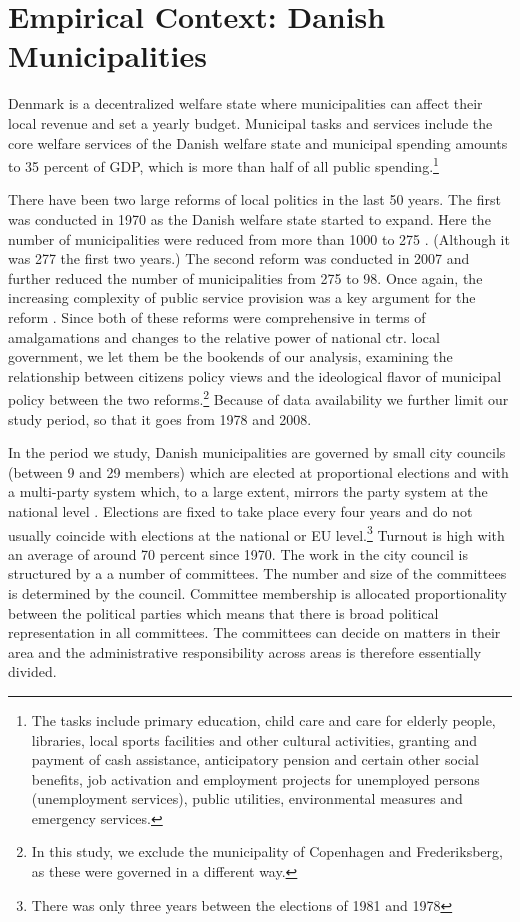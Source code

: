 \documentclass[a4paper,12pt]{article}
\begin{document}
\section{Empirical Context: Danish Municipalities}	
Denmark is a decentralized welfare state where municipalities can affect their local revenue and set a yearly budget.  Municipal tasks and services include the core welfare services of the Danish welfare state and municipal spending amounts to 35 percent of GDP, which is more than half of all public spending.\footnote{The tasks include primary education, child care and care for elderly people, libraries, local sports facilities and other cultural activities, granting and payment of cash assistance, anticipatory pension and certain other social benefits, job activation and employment projects for unemployed persons (unemployment services), public utilities, environmental measures and emergency services.}

There have been two large reforms of local politics in the last 50 years. The first was conducted in 1970 as the Danish welfare state started to expand. Here the number of municipalities were reduced from more than 1000 to 275 \citep{ingvartsen1991kommunalreformen}. (Although it was 277 the first two years.)  The second reform was conducted in 2007 and further reduced the number of municipalities from 275 to 98. Once again, the increasing complexity of public service provision was a key argument for the reform \citep{christiansen2008utaenkelige}. Since both of these reforms were comprehensive in terms of amalgamations and changes to the relative power of national ctr. local government, we let them be the bookends of our analysis, examining the relationship between citizens policy views and the ideological flavor of municipal policy between the two reforms.\footnote{In this study, we exclude the municipality of Copenhagen and Frederiksberg, as these were governed in a different way.} Because of data availability we further limit our study period, so that it goes from 1978 and 2008.


In the period we study, Danish municipalities are governed by small city councils (between 9 and 29 members) which are elected at proportional elections and with a multi-party system which, to a large extent, mirrors the party system at the national level \citep{blom2013et}. Elections are fixed to take place every four years and do not usually coincide with elections at the national or EU level.\footnote{There was only three years between the elections of 1981 and 1978} Turnout is high with an average of around 70 percent since 1970.  The work in the city council is structured by a a number of committees. The number and size of the committees is determined by the council. Committee membership is allocated proportionality between the political parties which means that there is broad political representation in all committees. The committees can decide on matters in their area and the administrative responsibility across areas is therefore essentially divided. 
\end{document}
